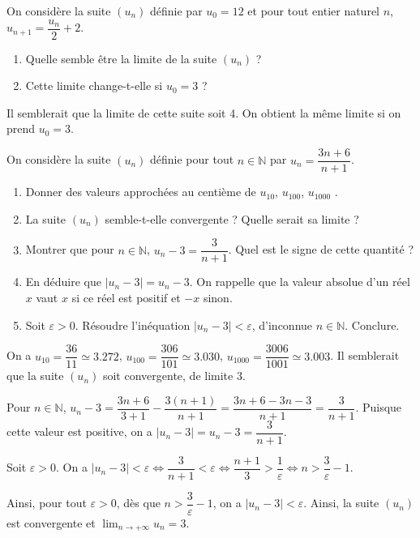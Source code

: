 \documentclass[11pt,fleqn]{book} %
\begin{document}
\begin{exercise}On considère la suite $(u_n)$ définie par $u_0=12$ et pour tout entier naturel $n$, $u_{n+1}= \dfrac{u_n}{2}+2$. 

\begin{enumerate}
\item Quelle semble être la limite de la suite $(u_n)$ ?
\item Cette limite change-t-elle si $u_0=3$ ?\end{enumerate}\end{exercise}
\begin{solution}Il semblerait que la limite de cette suite soit 4. On obtient la même limite si on prend $u_0=3$.\end{solution}




\begin{exercise}


On considère la suite $(u_n)$ définie pour tout $n\in\mathbb{N}$ par $u_n=\dfrac{3n+6}{n+1}$.
\begin{enumerate}
\item Donner des valeurs approchées au centième de $u_{10}$, $u_{100}$, $u_{1000}$ .
\item La suite $(u_n)$ semble-t-elle convergente ? Quelle serait sa limite ?
\item Montrer que pour $n\in\mathbb{N}$, $u_n-3=\dfrac{3}{n+1}$. Quel est le signe de cette quantité ?
\item En déduire que $|u_n-3|=u_n-3$. On rappelle que la valeur absolue d'un réel $x$ vaut $x$ si ce réel est positif et $-x$ sinon.
\item Soit $\varepsilon >0$. Résoudre l'inéquation $\left\lvert u_n - 3 \right\rvert < \varepsilon$, d'inconnue $n\in\mathbb{N}$. Conclure.
\end{enumerate}\end{exercise}
\begin{solution}On a $u_{10}=\dfrac{36}{11}\simeq 3.272$, $u_{100}=\dfrac{306}{101}\simeq 3.030$, $u_{1000}=\dfrac{3006}{1001}\simeq 3.003$. Il semblerait que la suite $(u_n)$ soit convergente, de limite 3.

Pour $n\in\mathbb{N}$, $u_n-3=\dfrac{3n+6}{3+1}-\dfrac{3(n+1)}{n+1}=\dfrac{3n+6-3n-3}{n+1}=\dfrac{3}{n+1}$. Puisque cette valeur est positive, on a $|u_n-3|=u_n-3=\dfrac{3}{n+1}$.

Soit $\varepsilon >0$. On a $\left\lvert u_n - 3 \right\rvert < \varepsilon \Leftrightarrow \dfrac{3}{n+1}< \varepsilon \Leftrightarrow \dfrac{n+1}{3} > \dfrac{1}{\varepsilon} \Leftrightarrow n > \dfrac{3}{\varepsilon}-1$.

Ainsi, pour tout $\varepsilon > 0$, dès que $n > \dfrac{3}{\varepsilon}-1$, on a $\left\lvert u_n - 3 \right\rvert < \varepsilon$. Ainsi, la suite $(u_n)$ est convergente et $\displaystyle \lim _{n\to + \infty}u_n=3$.\end{solution}
\end{document}
